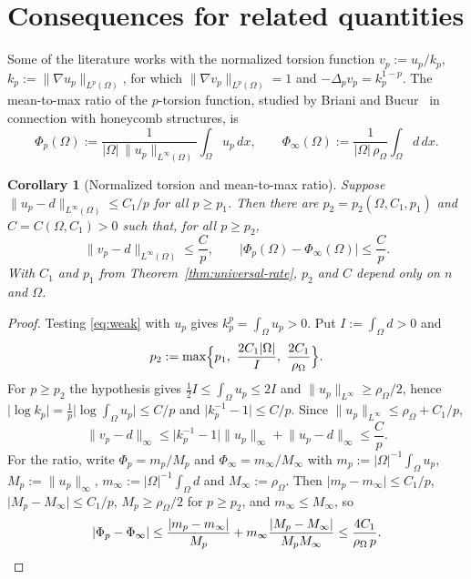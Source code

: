 \documentclass[11pt]{article}
\newcommand{\abs}[1]{\lvert #1\rvert}
\newcommand{\norm}[1]{\lVert #1\rVert}
\newtheorem{corollary}[theorem]{Corollary}
\theoremstyle{definition}
\theoremstyle{remark}
\begin{document}
\section{Consequences for related quantities}\label{sec:consequences}
Some of the literature works with the normalized torsion function
$v_p:=u_p/k_p$, $k_p:=\norm{\nabla u_p}_{L^p(\Omega)}$, for which
$\norm{\nabla v_p}_{L^p(\Omega)}=1$ and $-\Delta_pv_p=k_p^{1-p}$. The
mean-to-max ratio of the $p$-torsion function, studied by Briani and
Bucur~\cite{BB} in connection with honeycomb structures, is
\[
\Phi_p(\Omega):=\frac{1}{\abs{\Omega}\,\norm{u_p}_{L^\infty(\Omega)}}
\int_\Omega u_p\,dx,
\qquad
\Phi_\infty(\Omega):=\frac{1}{\abs{\Omega}\,\rho_\Omega}\int_\Omega d\,dx.
\]
\begin{corollary}[Normalized torsion and mean-to-max ratio]\label{cor:consequences}
Suppose $\norm{u_p-d}_{L^\infty(\Omega)}\le C_1/p$ for all $p\ge p_1$. Then
there are $p_2=p_2(\Omega,C_1,p_1)$ and $C=C(\Omega,C_1)>0$ such that, for
all $p\ge p_2$,
\[
\norm{v_p-d}_{L^\infty(\Omega)}\le\frac{C}{p},
\qquad
\abs{\Phi_p(\Omega)-\Phi_\infty(\Omega)}\le\frac{C}{p}.
\]
With $C_1$ and $p_1$ from Theorem~\ref{thm:universal-rate}, $p_2$ and $C$
depend only on $n$ and $\Omega$.
\end{corollary}
\begin{proof}
Testing \eqref{eq:weak} with $u_p$ gives $k_p^p=\int_\Omega u_p>0$. Put
$I:=\int_\Omega d>0$ and
\[
p_2:=\max\Bigl\{p_1,\ \frac{2C_1\abs\Omega}{I},\ \frac{2C_1}{\rho_\Omega}\Bigr\}.
\]
For $p\ge p_2$ the hypothesis gives $\tfrac12I\le\int_\Omega u_p\le2I$ and
$\norm{u_p}_{L^\infty}\ge\rho_\Omega/2$, hence
$\abs{\log k_p}=\frac1p\abs{\log\int_\Omega u_p}\le C/p$ and
$\abs{k_p^{-1}-1}\le C/p$. Since $\norm{u_p}_{L^\infty}\le\rho_\Omega+C_1/p$,
\[
\norm{v_p-d}_\infty\le\abs{k_p^{-1}-1}\norm{u_p}_\infty
+\norm{u_p-d}_\infty\le\frac{C}{p}.
\]
For the ratio, write $\Phi_p=m_p/M_p$ and $\Phi_\infty=m_\infty/M_\infty$
with $m_p:=\abs{\Omega}^{-1}\int_\Omega u_p$, $M_p:=\norm{u_p}_\infty$,
$m_\infty:=\abs{\Omega}^{-1}\int_\Omega d$ and $M_\infty:=\rho_\Omega$. Then
$\abs{m_p-m_\infty}\le C_1/p$, $\abs{M_p-M_\infty}\le C_1/p$,
$M_p\ge\rho_\Omega/2$ for $p\ge p_2$, and $m_\infty\le M_\infty$, so
\[
\abs{\Phi_p-\Phi_\infty}
\le\frac{\abs{m_p-m_\infty}}{M_p}
+m_\infty\frac{\abs{M_p-M_\infty}}{M_pM_\infty}
\le\frac{4C_1}{\rho_\Omega\,p}. \qedhere
\]
\end{proof}
\end{document}
